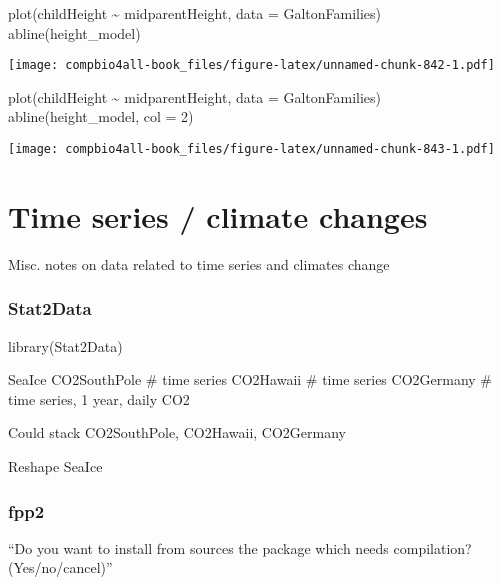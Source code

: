 \documentclass[
]{book}
\newenvironment{Shaded}{\begin{snugshade}}{\end{snugshade}}
\newcommand{\AttributeTok}[1]{\textcolor[rgb]{0.77,0.63,0.00}{#1}}
\newcommand{\DecValTok}[1]{\textcolor[rgb]{0.00,0.00,0.81}{#1}}
\newcommand{\FunctionTok}[1]{\textcolor[rgb]{0.00,0.00,0.00}{#1}}
\newcommand{\NormalTok}[1]{#1}
\newcommand{\SpecialCharTok}[1]{\textcolor[rgb]{0.00,0.00,0.00}{#1}}
\begin{document}
\begin{Shaded}
\begin{Highlighting}[]
\FunctionTok{plot}\NormalTok{(childHeight }\SpecialCharTok{\textasciitilde{}}\NormalTok{ midparentHeight, }\AttributeTok{data =}\NormalTok{ GaltonFamilies)}
\FunctionTok{abline}\NormalTok{(height\_model)}
\end{Highlighting}
\end{Shaded}

\texttt{[image: compbio4all-book\_files/figure-latex/unnamed-chunk-842-1.pdf]}

\begin{Shaded}
\begin{Highlighting}[]
\FunctionTok{plot}\NormalTok{(childHeight }\SpecialCharTok{\textasciitilde{}}\NormalTok{ midparentHeight, }\AttributeTok{data =}\NormalTok{ GaltonFamilies)}
\FunctionTok{abline}\NormalTok{(height\_model, }\AttributeTok{col =} \DecValTok{2}\NormalTok{)}
\end{Highlighting}
\end{Shaded}

\texttt{[image: compbio4all-book\_files/figure-latex/unnamed-chunk-843-1.pdf]}

\hypertarget{time-series-climate-changes}{%
\chapter{Time series / climate changes}\label{time-series-climate-changes}}

Misc. notes on data related to time series and climates change

\hypertarget{stat2data}{%
\subsection{Stat2Data}\label{stat2data}}

library(Stat2Data)

SeaIce
CO2SouthPole \# time series
CO2Hawaii \# time series
CO2Germany \# time series, 1 year, daily
CO2

Could stack CO2SouthPole, CO2Hawaii, CO2Germany

Reshape SeaIce

\hypertarget{fpp2}{%
\subsection{fpp2}\label{fpp2}}

``Do you want to install from sources the package which needs compilation? (Yes/no/cancel)''
\end{document}
